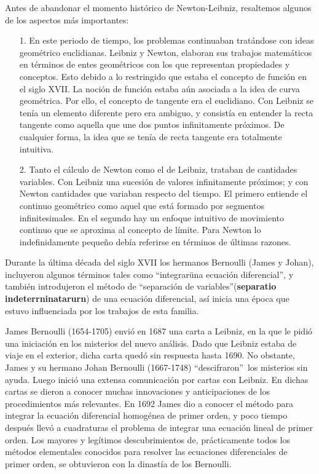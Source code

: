 \documentclass[12pt,a4paper,oneside]{book}
\begin{document}
	\medskip
	\noindent
	Antes de abandonar el momento histórico de Newton-Leibniz, resaltemos algunos de los aspectos más importantes:
	\begin{itemize}
		\item[1.] En este periodo de tiempo, los problemas continuaban tratándose con ideas geométrico euclidianas. Leibniz y Newton, elaboran sus trabajos matemáticos en términos de entes geométricos con los
		que representan propiedades y conceptos. Esto debido a lo restringido que estaba el concepto de función en el siglo XVII. La noción de función estaba aún asociada a la idea de curva geométrica. Por ello, el concepto de tangente era el euclidiano. Con Leibniz se tenía un elemento diferente pero era ambiguo, y consistía en entender la recta tangente como aquella que une dos puntos infinitamente próximos. De cualquier forma, la idea que se tenía de recta tangente era totalmente intuitiva.
		\item[2.] Tanto el cálculo de Newton como el de Leibniz, trataban de cantidades variables. Con Leibniz una sucesión de valores infinitamente próximos; y con Newton cantidades que variaban respecto del tiempo. El primero entiende el continuo geométrico como aquel que está formado por segmentos infinitesimales. En el segundo hay un enfoque intuitivo de movimiento continuo que se aproxima al concepto
		de límite. Para Newton lo indefinidamente pequeño debía referirse en términos de últimas razones.
	\end{itemize}
	
	\medskip
	\noindent
	Durante la última década del siglo XVII los hermanos Bernoulli (James y Johan), incluyeron algunos términos tales como \textquotedblleft integrarüna ecuación diferencial\textquotedblright, y también introdujeron
	el método de \textquotedblleft separación de variables\textquotedblright (\textbf{separatio indeterrninatarurn}) de una ecuación diferencial, así inicia una época que estuvo influenciada por los trabajos de esta familia.
	
	\medskip
	\noindent
	James Bernoulli (1654-1705) envió en 1687 una carta a Leibniz, en la que le pidió una iniciación en los misterios del nuevo análisis. Dado que Leibniz estaba de viaje en el exterior, dicha carta quedó sin respuesta hasta 1690. No obstante, James y su hermano Johan Bernoulli (1667-1748) \textquotedblleft descifraron\textquotedblright\ los misterios sin ayuda. Luego inició una extensa comunicación por cartas con Leibniz. En dichas cartas se dieron a conocer muchas innovaciones y anticipaciones de los procedimientos más relevantes. En 1692 James dio a conocer el método para integrar la ecuación diferencial homogénea de primer orden, y poco tiempo después llevó a cuadraturas el problema de integrar una ecuación lineal de primer orden. Los mayores y legítimos descubrimientos de, prácticamente todos los métodos elementales conocidos para resolver las ecuaciones diferenciales de primer orden, se obtuvieron con la dinastía de los Bernoulli.
	
\end{document}
